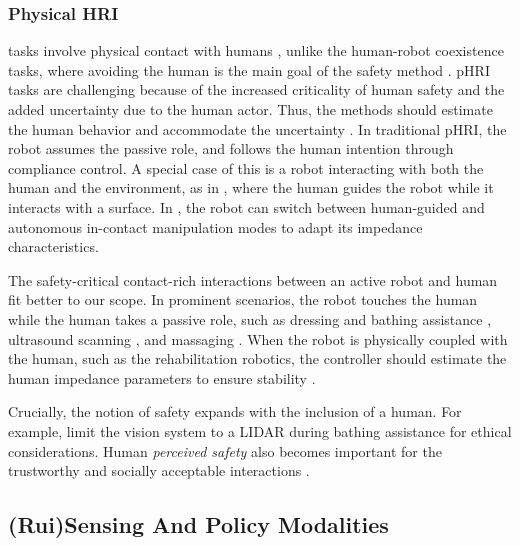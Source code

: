 \documentclass[Afour,sageh,times]{template/sagej}
\newcommand{\suggest}[1]{{\color{olive} (#1)}}
\begin{document}
\subsubsection{Physical HRI}\label{sec:task-hri} tasks involve physical contact with humans \citep{52}, unlike the human-robot coexistence tasks, where avoiding the human is the main goal of the safety method \citep{57}. 
pHRI tasks are challenging because of the increased criticality of human safety and the added uncertainty due to the human actor. 
Thus, the methods should estimate the human behavior and accommodate the uncertainty \citep{ajoudani2018progress}. 
In traditional pHRI, the robot assumes the passive role, and follows the human intention through compliance control. 
A special case of this is a robot interacting with both the human and the environment, as in \cite{17}, where the human guides the robot while it interacts with a surface.
In \cite{59}, the robot can switch between human-guided and autonomous in-contact manipulation modes to adapt its impedance characteristics.

The safety-critical contact-rich interactions between an active robot and human fit better to our scope. 
In prominent scenarios, the robot touches the human while the human takes a passive role, such as dressing \citep{9} and bathing assistance \citep{5}, ultrasound scanning \citep{14}, and massaging \citep{19, 46}.
When the robot is physically coupled with the human, such as the rehabilitation robotics, the controller should estimate the human impedance parameters to ensure stability \citep{24}.

Crucially, the notion of safety expands with the inclusion of a human. For example, \cite{5} limit the vision system to a LIDAR during bathing assistance for ethical considerations. Human \textit{perceived safety} also becomes important for the trustworthy and socially acceptable interactions \citep{bartneck2009measurement}. 

\subsection{\suggest{Rui}Sensing And Policy Modalities}

\end{document}
